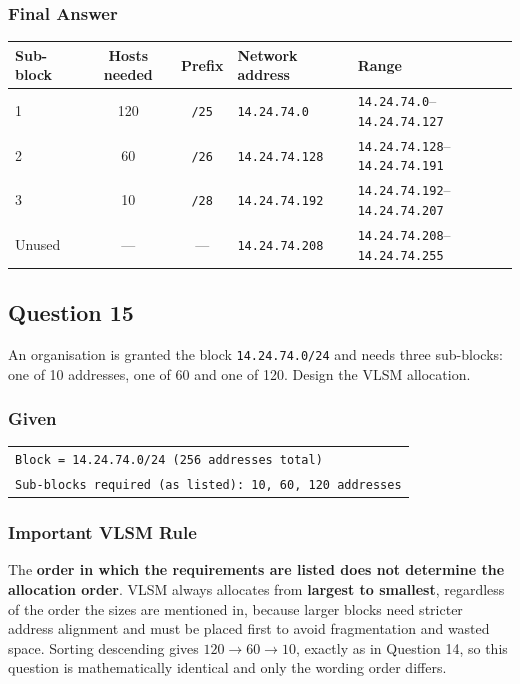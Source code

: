 \documentclass[11pt,a4paper]{article}
\begin{document}
\subsubsection*{Final Answer}

\begin{tabularx}{\textwidth}{@{}lccll@{}}
\toprule
\rowcolor{tablehead}\textbf{Sub-block} & \textbf{Hosts needed} & \textbf{Prefix} & \textbf{Network address} & \textbf{Range} \\
\midrule
1 & 120 & \texttt{/25} & \texttt{14.24.74.0} & \texttt{14.24.74.0}--\texttt{14.24.74.127} \\
2 & 60 & \texttt{/26} & \texttt{14.24.74.128} & \texttt{14.24.74.128}--\texttt{14.24.74.191} \\
3 & 10 & \texttt{/28} & \texttt{14.24.74.192} & \texttt{14.24.74.192}--\texttt{14.24.74.207} \\
Unused & --- & --- & \texttt{14.24.74.208} & \texttt{14.24.74.208}--\texttt{14.24.74.255} \\
\bottomrule
\end{tabularx}

\subsection*{Question 15}

An organisation is granted the block \texttt{14.24.74.0/24} and needs three sub-blocks: one of
10 addresses, one of 60 and one of 120. Design the VLSM allocation.

\subsubsection*{Given}

\begin{tabularx}{\textwidth}{@{}X@{}}
\texttt{Block = 14.24.74.0/24 (256 addresses total)} \\
\texttt{Sub-blocks required (as listed): 10, 60, 120 addresses} \\
\end{tabularx}

\subsubsection*{Important VLSM Rule}

The \textbf{order in which the requirements are listed does not determine the
allocation order}. VLSM always allocates from \textbf{largest to smallest},
regardless of the order the sizes are mentioned in, because larger blocks need
stricter address alignment and must be placed first to avoid fragmentation and
wasted space. Sorting descending gives $120 \to 60 \to 10$, exactly as in
Question 14, so this question is mathematically identical and only the wording
order differs.
\end{document}
